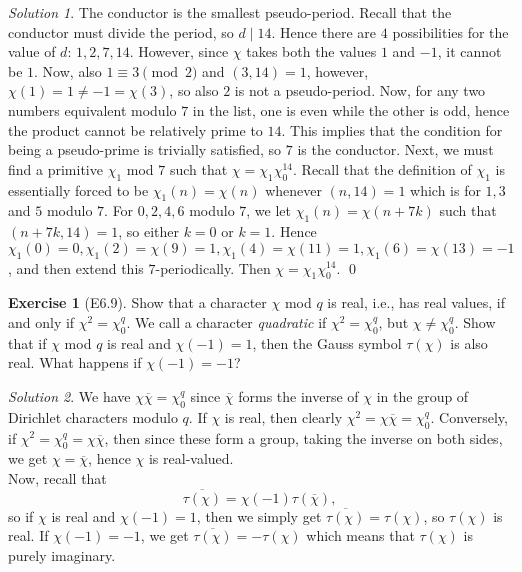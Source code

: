\documentclass[reqno]{amsart}
\theoremstyle{definition}
\newtheorem{exercise}[theorem]{Exercise}
\theoremstyle{remark}
\newtheorem*{solution}{Solution}
\begin{document}
\begin{solution}
    The conductor is the smallest pseudo-period.
    Recall that the conductor must divide the period, so
    $d  \mid 14$. Hence there are $4$ possibilities for
    the value of $d$: $1, 2, 7, 14$.
    However, since  $\chi$ takes both the values
    $1$ and $-1$, it cannot be $1$.
    Now, also $1 \equiv 3 \pmod{2}$ and
    $(3,14) = 1$, however,
    $\chi(1) = 1 \neq -1 = \chi(3)$, so also
    $2$ is not a pseudo-period. Now, for any
    two numbers equivalent modulo $7$ in the list, one
    is even while the other is odd, hence
    the product cannot be relatively prime to $14$.
    This implies that the condition for being
    a pseudo-prime is trivially satisfied, so
    $7$ is the conductor.
    Next, we must find a primitive
    $\chi_1$ mod $7$ such that
    $\chi = \chi_1 \chi_0^{14}$.
    Recall that the definition of $\chi_1$ is essentially
    forced to be
    $\chi_1 (n) = \chi(n)$ whenever
    $(n,14) = 1$ which is for
    $1,3$ and $5$ modulo $7$.
    For $0,2,4,6$ modulo  $7$, we let
    $\chi_1 (n) = \chi(n+7k)$ such that
    $(n+7k, 14) = 1$, so either
    $k = 0$ or $k= 1$.
    Hence $\chi_1 (0) = 0,
    \chi_1 (2) = \chi(9) = 1,
    \chi_1(4) = \chi (11) = 1,
    \chi_1(6) = \chi(13) = -1$, and then
    extend this $7$-periodically. 
    Then $\chi = \chi_1 \chi_0^{14}$.
    \qed
\end{solution}

\begin{exercise}[E6.9]
    Show that a character $\chi$ mod $q$ is real,
    i.e., has real values, if and only if
    $\chi^2 = \chi_0^{q}$. We call a character
    \textit{quadratic} if
    $\chi^2 = \chi_0^{q}$, but
    $\chi \neq \chi_0^{q}$. Show that if
    $\chi$ mod $q$ is real and $\chi(-1) = 1$, then the
    Gauss symbol $\tau (\chi)$ is also real.
    What happens if $\chi(-1) = -1$?
\end{exercise}

\begin{solution}
    We have
    $\chi \overline{\chi} = \chi_0^{q}$ since
    $\overline{\chi}$ forms the inverse of
    $\chi$ in the group of Dirichlet characters modulo
    $q$. If $\chi$ is real, then
    clearly $\chi^2 = \chi \overline{\chi} = 
    \chi_0^{q}$. Conversely, if
    $\chi^2 = \chi_0^{q} = \chi \overline{\chi}$, then
    since these form a group, taking the inverse on both sides,
    we get $\chi = \overline{\chi}$, hence
    $\chi$ is real-valued.\\
    Now, recall that
    \[
    \overline{\tau (\chi)} = \chi(-1)
    \tau\left( \overline{\chi} \right) ,
    \] 
    so if
    $\chi$ is real and $\chi(-1) = 1$, then
    we simply get
    $\overline{\tau(\chi)} = 
    \tau(\chi)$, so
    $\tau(\chi)$ is real. If
    $\chi(-1) = -1$, we get
    $\overline{\tau(\chi)} = 
    - \tau(\chi)$ which means that
    $\tau(\chi)$ is purely imaginary.
\end{solution}
\end{document}
